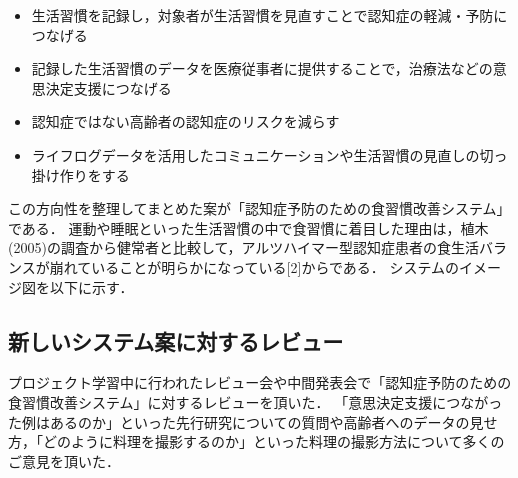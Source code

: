 \documentclass[../report]{subfiles}
\begin{document}
\begin{itemize}
    \item 生活習慣を記録し，対象者が生活習慣を見直すことで認知症の軽減・予防につなげる
    \item 記録した生活習慣のデータを医療従事者に提供することで，治療法などの意思決定支援につなげる
    \item 認知症ではない高齢者の認知症のリスクを減らす
    \item ライフログデータを活用したコミュニケーションや生活習慣の見直しの切っ掛け作りをする
\end{itemize}

この方向性を整理してまとめた案が「認知症予防のための食習慣改善システム」である．
運動や睡眠といった生活習慣の中で食習慣に着目した理由は，植木(2005)の調査から健常者と比較して，アルツハイマー型認知症患者の食生活バランスが崩れていることが明らかになっている[2]からである．
システムのイメージ図を以下に示す．

\subsection{新しいシステム案に対するレビュー}
プロジェクト学習中に行われたレビュー会や中間発表会で「認知症予防のための食習慣改善システム」に対するレビューを頂いた．
「意思決定支援につながった例はあるのか」といった先行研究についての質問や高齢者へのデータの見せ方，「どのように料理を撮影するのか」といった料理の撮影方法について多くのご意見を頂いた．
\end{document}
